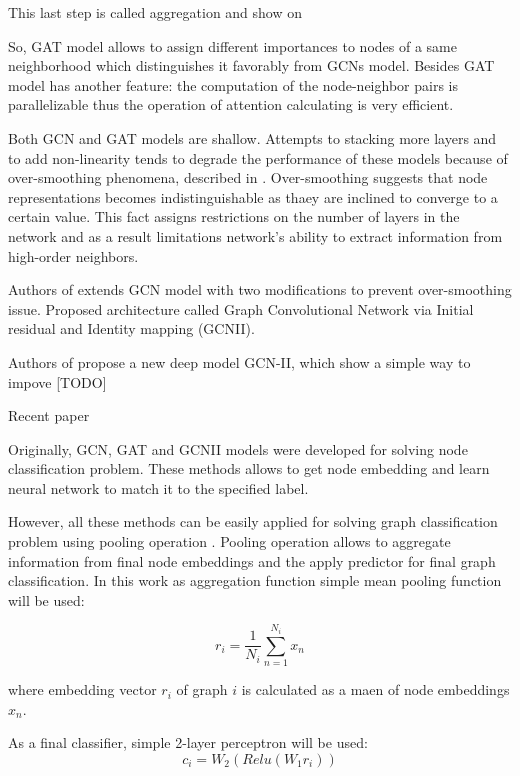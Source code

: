 This last step is called aggregation and show on %

So, GAT model allows to assign different importances to nodes of a same neighborhood which distinguishes it favorably from GCNs
model. Besides GAT model has another feature: the computation of the node-neighbor pairs is parallelizable thus the operation
of attention calculating is very efficient.


Both GCN\cite{GCN} and GAT\cite{GAT} models are shallow. Attempts to stacking more layers and to add non-linearity
tends to degrade the performance of these models \cite{GCNII} because of over-smoothing phenomena, described in \cite{OverSmoothing}.
Over-smoothing suggests that node representations becomes indistinguishable as thaey are inclined to converge 
to a certain value. This fact assigns restrictions on the number of layers in the network and as a result
limitations network's ability to extract information from high-order neighbors.



Authors of \cite{GCNII} extends GCN model with two modifications to prevent over-smoothing issue. Proposed architecture 
called Graph Convolutional Network via Initial residual and Identity mapping (GCNII).


Authors of \cite{GCNII} propose a new deep model GCN-II, which show a simple way to impove [TODO]

Recent paper \cite{GCNII}





Originally, GCN, GAT and GCNII models were developed for solving node classification problem.
These methods allows to get node embedding and learn neural network to match it to the specified label.

However, all these methods can be easily applied for solving graph classification problem using pooling operation \cite{distillGCN}.
Pooling operation allows to aggregate information from final node embeddings and the apply predictor for final graph classification.
In this work as aggregation function simple mean pooling function will be used:

\begin{equation}
    r_i = \frac{1}{N_i}\sum_{n=1}^{N_i}x_n
    \label{eq:mean_pool}
\end{equation}

where embedding vector $r_i$ of graph $i$ is calculated as a maen of node embeddings $x_n$.

As a final classifier, simple 2-layer perceptron will be used:
\begin{equation}
    c_i = W_2(Relu(W_1r_i))
    \label{eq:final_classifier}
\end{equation}



